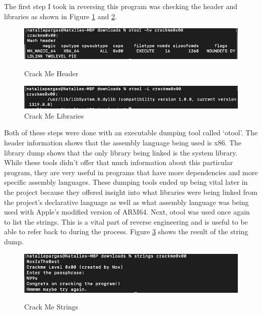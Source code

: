 The first step I took in reversing this program was checking the header and libraries as shown in Figure \ref{fig:crackmeheader} and \ref{fig:crackmelibs}.
\begin{figure}[H]
	\caption{Crack Me Header}
	\includegraphics[width=\linewidth] {crackmeheader.png}
        \label{fig:crackmeheader}
\end{figure}
\begin{figure}[H]
    \centering
    \includegraphics[width=\linewidth]{crackmelibs.png}
    \caption{Crack Me Libraries}
    \label{fig:crackmelibs}
\end{figure}



Both of these steps were done with an executable dumping tool called ‘otool’. 
The header information shows that the assembly language being used is x86. 
The library dump shows that the only library being linked is the system library. 
While these tools didn’t offer that much information about this particular program, they are very useful in programs that have more dependencies and more specific assembly languages. 
These dumping tools ended up being vital later in the project because they offered insight into what libraries were being linked from the project's declarative language as well as what assembly language was being used with Apple’s modified version of ARM64. 
Next, otool was used once again to list the strings. 
This is a vital part of reverse engineering and is useful to be able to refer back to during the process. 
Figure \ref{fig:crackmestrings} shows the result of the string dump.


\begin{figure}[H]
	\caption{Crack Me Strings}
	\includegraphics[width=\linewidth]{crackmestrings.png}
        \label{fig:crackmestrings}
\end{figure}

